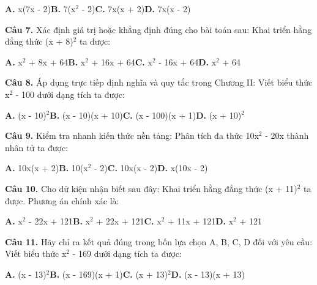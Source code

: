 \documentclass[11pt,a4paper]{article}
\begin{document}
\hspace*{1.5em}\textbf{A.} x(7x - 2)\quad\quad \textbf{B.} 7(x$^2$ - 2)\quad\quad \textbf{C.} 7x(x + 2)\quad\quad \textbf{D.} 7x(x - 2)\par\vspace{2pt}
\textbf{\color{primary} Câu 7.} Xác định giá trị hoặc khẳng định đúng cho bài toán sau: Khai triển hằng đẳng thức (x + 8)$^2$ ta được:\par
\hspace*{1.5em}\textbf{A.} x$^2$ + 8x + 64\quad\quad \textbf{B.} x$^2$ + 16x + 64\quad\quad \textbf{C.} x$^2$ - 16x + 64\quad\quad \textbf{D.} x$^2$ + 64\par\vspace{2pt}
\textbf{\color{primary} Câu 8.} Áp dụng trực tiếp định nghĩa và quy tắc trong Chương II: Viết biểu thức x$^2$ - 100 dưới dạng tích ta được:\par
\hspace*{1.5em}\textbf{A.} (x - 10)$^2$\quad\quad \textbf{B.} (x - 10)(x + 10)\quad\quad \textbf{C.} (x - 100)(x + 1)\quad\quad \textbf{D.} (x + 10)$^2$\par\vspace{2pt}
\textbf{\color{primary} Câu 9.} Kiểm tra nhanh kiến thức nền tảng: Phân tích đa thức 10x$^2$ - 20x thành nhân tử ta được:\par
\hspace*{1.5em}\textbf{A.} 10x(x + 2)\quad\quad \textbf{B.} 10(x$^2$ - 2)\quad\quad \textbf{C.} 10x(x - 2)\quad\quad \textbf{D.} x(10x - 2)\par\vspace{2pt}
\textbf{\color{primary} Câu 10.} Cho dữ kiện nhận biết sau đây: Khai triển hằng đẳng thức (x + 11)$^2$ ta được. Phương án chính xác là:\par
\hspace*{1.5em}\textbf{A.} x$^2$ - 22x + 121\quad\quad \textbf{B.} x$^2$ + 22x + 121\quad\quad \textbf{C.} x$^2$ + 11x + 121\quad\quad \textbf{D.} x$^2$ + 121\par\vspace{2pt}
\textbf{\color{primary} Câu 11.} Hãy chỉ ra kết quả đúng trong bốn lựa chọn A, B, C, D đối với yêu cầu: Viết biểu thức x$^2$ - 169 dưới dạng tích ta được:\par
\hspace*{1.5em}\textbf{A.} (x - 13)$^2$\quad\quad \textbf{B.} (x - 169)(x + 1)\quad\quad \textbf{C.} (x + 13)$^2$\quad\quad \textbf{D.} (x - 13)(x + 13)\par\vspace{2pt}
\end{document}
